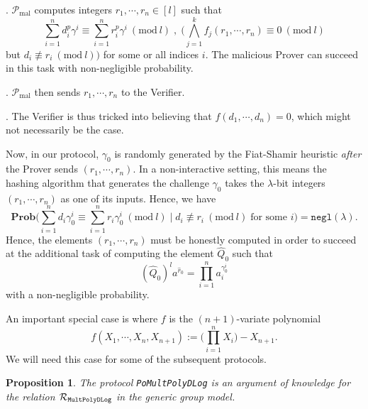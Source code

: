 \documentclass[11pt, lettersize, notitlepage, leqno, footskip=0.6cm]{article}
\newcommand{\pl}{\prod\limits}
\newcommand{\slim}{\sum\limits}
\newcommand{\ttt}{\texttt}
\newcommand{\negl}{\ttt{{negl}}}
\newcommand{\mc}{\mathcal}
\newcommand{\mb}{\mathbb}
\newcommand{\mbf}{\mathbf}
\newcommand{\mr}{\mathrm}
\newcommand{\lam}{\lambda}
\newcommand{\what}{\widehat}
\newcommand{\Prob}{\mbf{Prob}}
\newcommand{\mP}{\mc{P}}
\newcommand{\vs}{\vspace{-0.15cm}}
\newcommand{\noin}{\noindent}
\newcommand{\Mod}[1]{\ (\mathrm{mod}\ #1)}
\newtheorem{Prop}[Thm]{Proposition}
\numberwithin{equation}{section}
\begin{document}
\noin 1. $\mP_{\mr{mal}}$ computes integers $r_1,\cdots,r_n\in[l]$ such that \vs $$ \slim_{i=1}^n d_i^{p}\gamma^i\equiv\slim_{i=1}^n r_i^{p}\gamma^i\Mod{l} \;,\;\Big( \bigwedge\limits_{j=1}^k f_j(r_1,\cdots,r_n) \equiv 0\Mod{l}$$ but $d_i\not\equiv r_i\Mod{l}\Big)$ for some or all indices $i$. The malicious Prover can succeed in this task with non-negligible probability.

\noin 2. $\mP_{\mr{mal}}$ then sends $r_1,\cdots,r_n$ to the Verifier.

\noin 3. The Verifier is thus tricked into believing that $f(d_1,\cdots,d_n) = 0$, which might not necessarily be the case.

Now, in our protocol, $\gamma_0$ is randomly generated by the Fiat-Shamir heuristic \textit{after} the Prover sends $(r_1,\cdots,r_n)$. In a non-interactive setting, this means the hashing algorithm that generates the challenge $\gamma_0$ takes the $\lam$-bit integers $(r_1,\cdots,r_n)$ as one of its inputs. Hence, we have \vs $$\Prob\Big(\slim_{i=1}^n d_i\gamma_0^i \equiv \slim_{i=1}^n r_i\gamma_0^i \Mod{l}\;\Big|\; d_i\not\equiv r_i\Mod{l}\;\text{for some } i\Big) = \negl(\lam). $$ Hence, the elements $(r_1,\cdots,r_n)$ must be honestly computed in order to succeed at the additional task of computing the element $\what{Q}_0$ such that \vs $$(\what{Q}_0)^la^{\what{r}_0} = \pl_{i=1}^{n} a_i^{\gamma_0^i} $$ with a non-negligible probability.

\begin{comment} Although the proof is linear in size because of the $\lam$-bit integers $r_1,\cdots,r_n$, the number of $\mb{G}$-elements in this proof is constant. Since the group elements are much larger than $\lam$-bits, the communication complexity is substantially smaller that sending over $n$ separate arguments of knowledge. For instance, when $\lam = 128$, the group elements are of bit-size $3072$ with a RSA group, $6656$-bits with an imaginary quadratic class group and $3300$-bits with a Jacobian of a genus three hyperelliptic curve.\end{comment}

An important special case is where $f$ is the $(n+1)$-variate polynomial \vs $$f(X_1,\cdots,X_n, X_{n+1}) := \big(\pl_{i=1}^n X_i \big)- X_{n+1}.$$ We will need this case for some of the subsequent protocols. \vspace{0.2cm}


\begin{Prop} The protocol \verb|PoMultPolyDLog| is an argument of knowledge for the relation $\mc{R}_{{\tt{MultPolyDLog}}}$ in the generic group model.\end{Prop}
\end{document}
